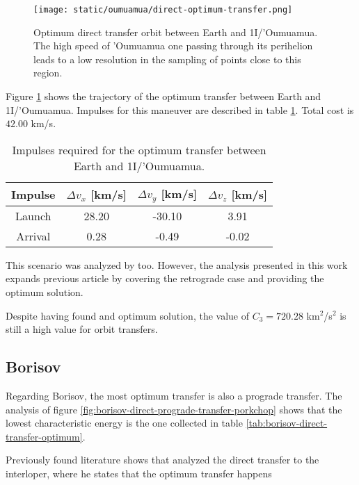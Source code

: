 \begin{figure}[H]
  \centering
  \texttt{[image: static/oumuamua/direct-optimum-transfer.png]}
  \caption{Optimum direct transfer orbit between Earth and 1I/'Oumuamua. The
    high speed of 'Oumuamua one passing through its perihelion leads to a low
    resolution in the sampling of points close to this region.}
  \label{fig:oumuamua-direct-transfer-orbit}
\end{figure}

Figure \ref{fig:oumuamua-direct-transfer-orbit} shows the trajectory of the
optimum transfer between Earth and 1I/'Oumuamua. Impulses for this maneuver are
described in table \ref{tab:oumuamua-direct-transfer-impulses}. Total cost is
$42.00$ km/s.

\begin{table}[H]
  \centering
  \begin{tabular}{|c|c|c|c|}
    \hline
    Impulse & $\Delta v_x$ [km/s] & $\Delta v_y$ [km/s] & $\Delta v_z$ [km/s] \\
    \hline
    Launch & 28.20 & -30.10 & 3.91 \\
    \hline
    Arrival & 0.28 & -0.49 & -0.02 \\
    \hline
  \end{tabular}
  \caption{Impulses required for the optimum transfer between Earth and 1I/'Oumuamua.}
  \label{tab:oumuamua-direct-transfer-impulses}
\end{table}

This scenario was analyzed by \cite{hein2018} too. However, the analysis
presented in this work expands previous article by covering the retrograde case
and providing the optimum solution.

Despite having found and optimum solution, the value of $C_3 = 720.28$
km$^2$/s$^2$ is still a high value for orbit transfers.

\subsection{Borisov}

Regarding Borisov, the most optimum transfer is also a prograde transfer. The
analysis of figure \ref{fig:borisov-direct-prograde-transfer-porkchop} shows
that the lowest characteristic energy is the one collected in table
\ref{tab:borisov-direct-transfer-optimum}.

Previously found literature shows that \cite{hibberd2021} analyzed the direct
transfer to the interloper, where he states that the optimum transfer happens 

